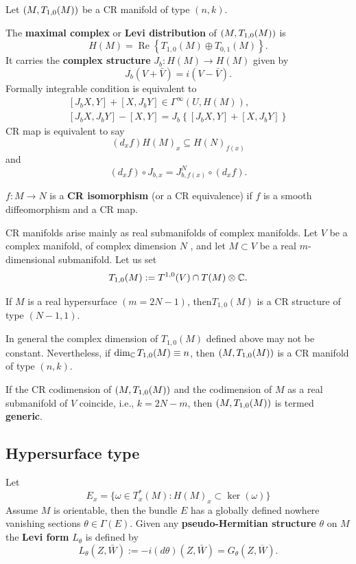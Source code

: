 Let ${(M,T_{1,0}(M))}$ be a CR manifold of type $(n,k)$.
\begin{definition}
    The\textbf{ maximal complex} or \textbf{Levi distribution} of ${(M,T_{1,0}(M))}$ is  
    $$
H(M)=\operatorname{Re}\left\{T_{1,0}(M) \oplus T_{0,1}(M)\right\}.
$$
It carries the \textbf{complex structure} $J_{b}: H(M) \rightarrow H(M)$ given by
$$
J_{b}(V+\bar{V})=i(V-\bar{V}).
$$
Formally integrable condition is equivalent to
$$
\begin{gathered}
{\left[J_{b} X, Y\right]+\left[X, J_{b} Y\right] \in \Gamma^{\infty}(U, H(M)),} \\
{\left[J_{b} X, J_{b} Y\right]-[X, Y]=J_{b}\left\{\left[J_{b} X, Y\right]+\left[X, J_{b} Y\right]\right\}}
\end{gathered}
$$
CR map is equivalent to say
$$
\left(d_{x} f\right) H(M)_{x} \subseteq H(N)_{f(x)}
$$
and
$$
\left(d_{x} f\right) \circ J_{b, x}=J_{b, f(x)}^{N} \circ\left(d_{x} f\right).
$$
\end{definition}
  
\begin{definition}
   $ f : M \to N$ is a\textbf{ CR isomorphism} (or a CR equivalence) if $f$ is a smooth  diffeomorphism and a CR map.
\end{definition}

CR manifolds arise mainly as real submanifolds of complex manifolds. Let $V$ be a complex manifold, of complex dimension $N$ , and let $M \subset V$ be a real $m$-dimensional submanifold. Let us set
$$ T_{1,0}(M):=T^{1,0}(V) \cap T(M) \otimes {\mathbb C}. $$
\begin{proposition}
    If $M$ is a real hypersurface $(m = 2N - 1)$, then$ T_{1,0}(M)$ is a CR structure of type $(N - 1, 1)$. 
\end{proposition}
In general the complex dimension of $T_{1,0}(M)$ defined above may not be constant. Nevertheless, if $ \dim _{{\mathbb C}}T_{1,0}(M)\equiv n $, then ${(M,T_{1,0}(M))}$  is a CR manifold of type $(n,k)$.
\begin{definition}
    If the CR codimension of ${(M,T_{1,0}(M))}$ and the codimension of $M$ as a real submanifold of $V$ coincide, i.e., $k=2N-m$,  then ${(M,T_{1,0}(M))}$  is termed \textbf{ generic}.
\end{definition}
   

\subsection{Hypersurface type}
 Let 
$$ E_x=\{\omega \in T^{*}_x(M):H(M)_x \subset \ker (\omega )\} $$ 
Assume $M$ is orientable, then the bundle $E$ has a globally defined nowhere vanishing sections $\theta \in \Gamma (E)$.  
Given any \textbf{pseudo-Hermitian structure} $\theta$ on $M$ the \textbf{Levi form} $L_{\theta}$ is defined by
$$
\boxed{L_{\theta}(Z, \bar{W}):=-i(d \theta)(Z, \bar{W})=G_{\theta }(Z, \overline{W}).}
$$

